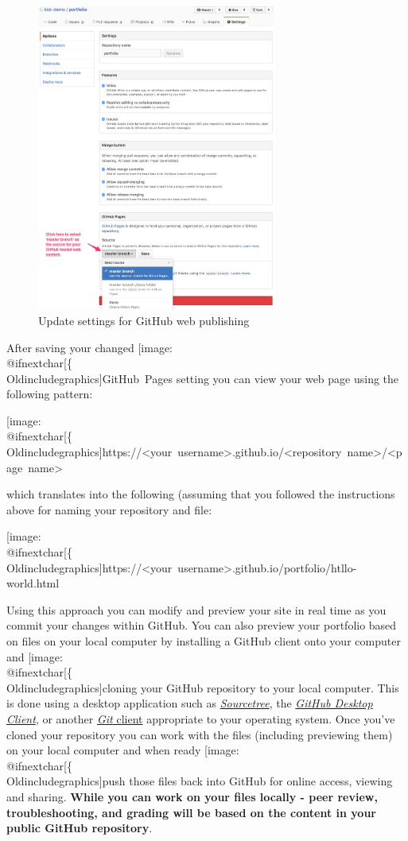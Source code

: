 \documentclass[]{book}
\makeatletter
\def\ScaleIfNeeded{%
  \ifdim\Gin@nat@width>.5\linewidth
    .5\linewidth
  \else
    \Gin@nat@width
  \fi
}
\let\Oldincludegraphics\texttt{[image: \%
 \\catcode`\\@=11\\relax\%
 \%\\gdef\\includegraphics\{\\@ifnextchar[\{\\Oldincludegraphics]}{\Oldincludegraphics[width=\ScaleIfNeeded]}}%
\gdef\texttt{[image: \\@ifnextchar[\{\\Oldincludegraphics]}{\Oldincludegraphics[max size={.75\textwidth}{.75\textheight}]}}%
\makeatother
\begin{document}
\begin{figure}[htbp]
\centering
\includegraphics[width=0.70000\textwidth]{images/github_settingsForWeb.jpg}
\caption{Update settings for GitHub web publishing}
\end{figure}

After saving your changed \texttt{GitHub\ Pages} setting you can view
your web page using the following pattern:

\texttt{https://\textless{}your\ username\textgreater{}.github.io/\textless{}repository\ name\textgreater{}/\textless{}page\ name\textgreater{}}

which translates into the following (assuming that you followed the
instructions above for naming your repository and file:

\texttt{https://\textless{}your\ username\textgreater{}.github.io/portfolio/htllo-world.html}

Using this approach you can modify and preview your site in real time as
you commit your changes within GitHub. You can also preview your
portfolio based on files on your local computer by installing a GitHub
client onto your computer and \texttt{cloning} your GitHub repository to
your local computer. This is done using a desktop application such as
\href{https://www.sourcetreeapp.com}{\emph{Sourcetree}}, the
\href{https://desktop.github.com}{\emph{GitHub Desktop Client}}, or
another \href{https://git-scm.com/downloads}{\emph{Git} client}
appropriate to your operating system. Once you've cloned your repository
you can work with the files (including previewing them) on your local
computer and when ready \texttt{push} those files back into GitHub for
online access, viewing and sharing. \textbf{While you can work on your
files locally - peer review, troubleshooting, and grading will be based
on the content in your public GitHub repository}.
\end{document}
